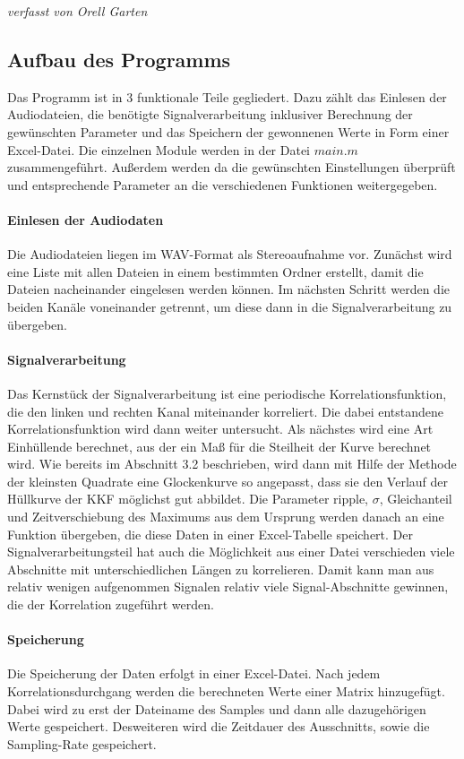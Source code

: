 \small\textit{verfasst von Orell Garten}
\normalsize
\subsection{Aufbau des Programms}
Das Programm ist in 3 funktionale Teile gegliedert. Dazu zählt das Einlesen der Audiodateien, die benötigte Signalverarbeitung inklusiver Berechnung der gewünschten Parameter und das Speichern der gewonnenen Werte in Form einer Excel-Datei. Die einzelnen Module werden in der Datei $main.m$ zusammengeführt. Außerdem werden da die gewünschten Einstellungen überprüft und entsprechende Parameter an die verschiedenen Funktionen weitergegeben.
\paragraph{Einlesen der Audiodaten}
Die Audiodateien liegen im WAV-Format als Stereoaufnahme vor. Zunächst wird eine Liste mit allen Dateien in einem bestimmten Ordner erstellt, damit die Dateien nacheinander eingelesen werden können. Im nächsten Schritt werden die beiden Kanäle voneinander getrennt, um diese dann in die Signalverarbeitung zu übergeben.
\paragraph{Signalverarbeitung}
Das Kernstück der Signalverarbeitung ist eine periodische Korrelationsfunktion, die den linken und rechten Kanal miteinander korreliert. Die dabei entstandene Korrelationsfunktion wird dann weiter untersucht. Als nächstes wird eine Art Einhüllende berechnet, aus der ein Maß für die Steilheit der Kurve berechnet wird. Wie bereits im Abschnitt 3.2 beschrieben, wird dann mit Hilfe der Methode der kleinsten Quadrate eine Glockenkurve so angepasst, dass sie den Verlauf der Hüllkurve der KKF möglichst gut abbildet. Die Parameter ripple, $\sigma$, Gleichanteil und Zeitverschiebung des Maximums aus dem Ursprung werden danach an eine Funktion übergeben, die diese Daten in einer Excel-Tabelle speichert.
Der Signalverarbeitungsteil hat auch die Möglichkeit aus einer Datei verschieden viele Abschnitte mit unterschiedlichen Längen zu korrelieren. Damit kann man aus relativ wenigen aufgenommen Signalen relativ viele Signal-Abschnitte gewinnen, die der Korrelation zugeführt werden.
\paragraph{Speicherung}
Die Speicherung der Daten erfolgt in einer Excel-Datei. Nach jedem Korrelationsdurchgang werden die berechneten Werte einer Matrix hinzugefügt. Dabei wird zu erst der Dateiname des Samples und dann alle dazugehörigen Werte gespeichert. Desweiteren wird die Zeitdauer des Ausschnitts, sowie die Sampling-Rate gespeichert.

